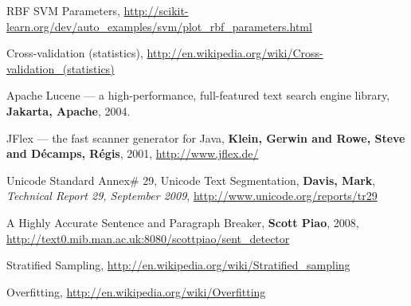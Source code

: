 \documentclass[a4paper,10pt]{report}
\begin{document}
\begin{thebibliography}{99}
 RBF SVM Parameters, \url{http://scikit-learn.org/dev/auto_examples/svm/plot_rbf_parameters.html}

 Cross-validation (statistics), \url{http://en.wikipedia.org/wiki/Cross-validation_(statistics)}

 Apache Lucene --- a high-performance, full-featured text search engine library, \textbf{Jakarta, Apache}, 2004.

 JFlex --- the fast scanner generator for Java, \textbf{Klein, Gerwin and Rowe, Steve and D{\'e}camps, R{\'e}gis}, 2001, \url{http://www.jflex.de/}

 Unicode Standard Annex\# 29, Unicode Text Segmentation, \textbf{Davis, Mark},\emph{ Technical Report 29, September 2009}, \url{http://www.unicode.org/reports/tr29}

 A Highly Accurate Sentence and Paragraph Breaker, \textbf{Scott Piao}, 2008, \url{http://text0.mib.man.ac.uk:8080/scottpiao/sent_detector}

 Stratified Sampling, \url{http://en.wikipedia.org/wiki/Stratified_sampling}

 Overfitting, \url{http://en.wikipedia.org/wiki/Overfitting}

\end{thebibliography}

\end{document}
